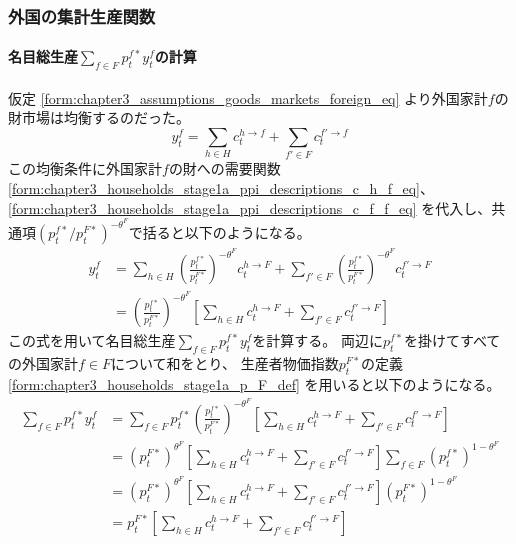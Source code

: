 \subsubsection{外国の集計生産関数}
\label{sec:chapter3_producers_aggregated_production_foreign}

\paragraph{名目総生産\(\sum_{f\in F}p_t^{f*}y_t^f\)の計算}
\label{sec:chapter3_producers_aggregated_production_foreign_nominal_aggregated_production}
仮定
\eqref{form:chapter3_assumptions_goods_markets_foreign_eq}
より外国家計\(f\)の財市場は均衡するのだった。
\begin{equation}
\label{form:chapter3_producers_aggregated_production_foreign_nominal_aggregated_production_y_f_eq}
    y_t^f=\sum_{h\in H}c_t^{h\to f}+\sum_{f'\in F}c_t^{f'\to f}
\end{equation}
この均衡条件に外国家計\(f\)の財への需要関数
\eqref{form:chapter3_households_stage1a_ppi_descriptions_c_h_f_eq}、
\eqref{form:chapter3_households_stage1a_ppi_descriptions_c_f_f_eq}
を代入し、共通項\((p_t^{f*}/p_t^{F*})^{-\theta^F}\)で括ると以下のようになる。
\begin{align}
\label{form:chapter3_producers_aggregated_production_foreign_nominal_aggregated_production_y_f_modified_eq}
    y_t^f&=\sum_{h\in H}\left(\frac{p_t^{f*}}{p_t^{F*}}\right)^{-\theta^F}c_t^{h\to F}+\sum_{f'\in F}\left(\frac{p_t^{f*}}{p_t^{F*}}\right)^{-\theta^F}c_t^{f'\to F} \nonumber \\
    &=\left(\frac{p_t^{f*}}{p_t^{F*}}\right)^{-\theta^F}\left[\sum_{h\in H}c_t^{h\to F}+\sum_{f'\in F}c_t^{f'\to F}\right]
\end{align}
この式を用いて名目総生産\(\sum_{f\in F}p_t^{f*}y_t^f\)を計算する。
両辺に\(p_t^{f*}\)を掛けてすべての外国家計\(f\in F\)について和をとり、
生産者物価指数\(p_t^{F*}\)の定義
\eqref{form:chapter3_households_stage1a_p_F_def}
を用いると以下のようになる。
\begin{align}
\label{form:chapter3_producers_aggregated_production_foreign_nominal_aggregated_production_sum_p_f_y_f_eq}
    \sum_{f\in F}p_t^{f*}y_t^f&=\sum_{f\in F}p_t^{f*}\left(\frac{p_t^{f*}}{p_t^{F*}}\right)^{-\theta^F}\left[\sum_{h\in H}c_t^{h\to F}+\sum_{f'\in F}c_t^{f'\to F}\right] \nonumber \\
    &=(p_t^{F*})^{\theta^F}\left[\sum_{h\in H}c_t^{h\to F}+\sum_{f'\in F}c_t^{f'\to F}\right]\sum_{f\in F}(p_t^{f*})^{1-\theta^F} \nonumber \\
    &=(p_t^{F*})^{\theta^F}\left[\sum_{h\in H}c_t^{h\to F}+\sum_{f'\in F}c_t^{f'\to F}\right](p_t^{F*})^{1-\theta^F} \nonumber \\
    &=p_t^{F*}\left[\sum_{h\in H}c_t^{h\to F}+\sum_{f'\in F}c_t^{f'\to F}\right]
\end{align}

